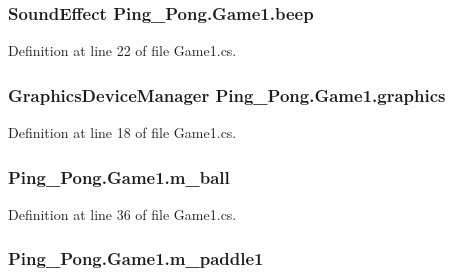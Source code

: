 \hypertarget{class_ping___pong_1_1_game1_aaa0f5f32149b8eb6abd8c148a4e47c36}{
\subsubsection[{beep}]{\setlength{\rightskip}{0pt plus 5cm}Sound\-Effect Ping\-\_\-\-Pong.\-Game1.\-beep\hspace{0.3cm}{\ttfamily [private]}}}\label{class_ping___pong_1_1_game1_aaa0f5f32149b8eb6abd8c148a4e47c36}


Definition at line 22 of file Game1.\-cs.

\hypertarget{class_ping___pong_1_1_game1_aaaff77331c3e33fc32f14a28fa530a7d}{
\subsubsection[{graphics}]{\setlength{\rightskip}{0pt plus 5cm}Graphics\-Device\-Manager Ping\-\_\-\-Pong.\-Game1.\-graphics\hspace{0.3cm}{\ttfamily [private]}}}\label{class_ping___pong_1_1_game1_aaaff77331c3e33fc32f14a28fa530a7d}


Definition at line 18 of file Game1.\-cs.

\hypertarget{class_ping___pong_1_1_game1_a3da763dfe56d5444101a2a3c2ea97389}{
\subsubsection[{m\-\_\-ball}]{ Ping\-\_\-\-Pong.\-Game1.\-m\-\_\-ball\hspace{0.3cm}{\ttfamily [private]}}}\label{class_ping___pong_1_1_game1_a3da763dfe56d5444101a2a3c2ea97389}


Definition at line 36 of file Game1.\-cs.

\hypertarget{class_ping___pong_1_1_game1_ac47e2989a6e169d42af4366f901c3d8a}{
\subsubsection[{m\-\_\-paddle1}]{ Ping\-\_\-\-Pong.\-Game1.\-m\-\_\-paddle1\hspace{0.3cm}{\ttfamily [private]}}}\label{class_ping___pong_1_1_game1_ac47e2989a6e169d42af4366f901c3d8a}


